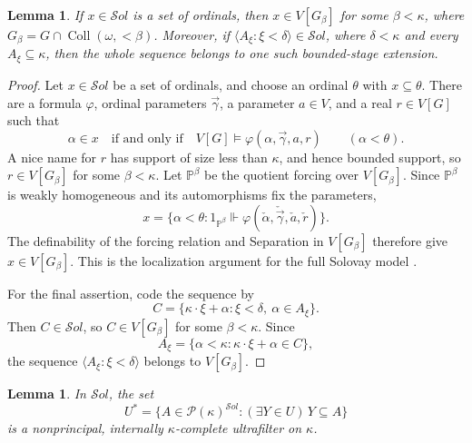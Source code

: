 \documentclass[11pt,a4paper]{amsart}
\newcommand{\Coll}{\operatorname{Coll}}
\theoremstyle{plain}
\newtheorem{lemma}[theorem]{Lemma}
\theoremstyle{definition}
\theoremstyle{remark}
\begin{document}
\begin{lemma}\label{lem:Solovay-localization}
If $x\in\mathcal S\!ol$ is a set of ordinals, then
$x\in V[G_\beta]$ for some $\beta<\kappa$, where
$G_\beta=G\cap{\Coll}(\omega,{<}\beta)$.  Moreover, if
$\langle A_\xi:\xi<\delta\rangle\in\mathcal S\!ol$, where
$\delta<\kappa$ and every $A_\xi\subseteq\kappa$, then the whole sequence belongs to one such bounded-stage extension.
\end{lemma}

\begin{proof}
Let $x\in\mathcal S\!ol$ be a set of ordinals, and choose an ordinal $\theta$ with $x\subseteq\theta$.  There are a formula $\varphi$, ordinal parameters $\vec\gamma$, a parameter $a\in V$, and a real $r\in V[G]$ such that
\[
\alpha\in x\quad\text{if and only if}\quad
V[G]\models\varphi(\alpha,\vec\gamma,a,r)
\qquad(\alpha<\theta).
\]
A nice name for $r$ has support of size less than $\kappa$, and hence bounded support, so $r\in V[G_\beta]$ for some $\beta<\kappa$.  Let $\mathbb P^\beta$ be the quotient forcing over $V[G_\beta]$.  Since $\mathbb P^\beta$ is weakly homogeneous and its automorphisms fix the parameters,
\[
x=\{\alpha<\theta:
1_{\mathbb P^\beta}\Vdash
\varphi(\check\alpha,\check{\vec\gamma},\check a,\check r)\}.
\]
The definability of the forcing relation and Separation in $V[G_\beta]$ therefore give $x\in V[G_\beta]$.  This is the localization argument for the full Solovay model \cite[Definition~4, Fact~5, and the paragraph following Fact~5]{SakaiTanno}.

For the final assertion, code the sequence by
\[
C=\{\kappa\cdot\xi+\alpha:\xi<\delta,\ \alpha\in A_\xi\}.
\]
Then $C\in\mathcal S\!ol$, so $C\in V[G_\beta]$ for some $\beta<\kappa$.  Since
\[
A_\xi=\{\alpha<\kappa:\kappa\cdot\xi+\alpha\in C\},
\]
the sequence $\langle A_\xi:\xi<\delta\rangle$ belongs to $V[G_\beta]$.
\end{proof}

\begin{lemma}\label{lem:Solovay-measure}
In $\mathcal S\!ol$, the set
\[
U^*=\{A\in\mathcal P(\kappa)^{\mathcal S\!ol}:
(\exists Y\in U)\,Y\subseteq A\}
\]
is a nonprincipal, internally $\kappa$-complete ultrafilter on $\kappa$.
\end{lemma}
\end{document}

